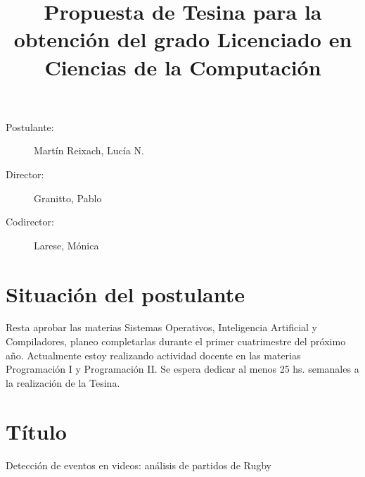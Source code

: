 \documentclass[11pt]{article}
\begin{document}
\title{Propuesta de Tesina para la obtención del grado Licenciado en Ciencias de la Computación}
\maketitle

\begin{description}
  \item[Postulante:] Martín Reixach, Lucía N.
  \item[Director:] Granitto, Pablo
  \item[Codirector:] Larese, Mónica
\end{description}

\section{Situación del postulante}
Resta aprobar las materias Sistemas Operativos, Inteligencia Artificial y Compiladores,
planeo completarlas durante el primer cuatrimestre del próximo año.
Actualmente estoy realizando actividad docente en las materias Programación I y Programación II.
Se espera dedicar al menos 25 hs. semanales a la realización de la Tesina.

\section{Título}
Detección de eventos en videos: análisis de partidos de Rugby






\printbibliography
\end{document}

